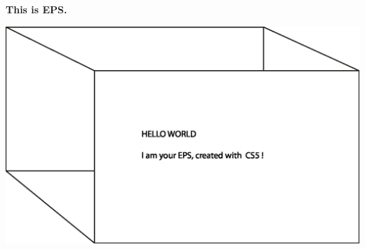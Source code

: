 \documentclass[11pt]{article}
\begin{document}
{\bfseries This is EPS.}
\begin{center}
\includegraphics[width=1.0\textwidth]{bild-01.eps}
\end{center}
\end{document}
